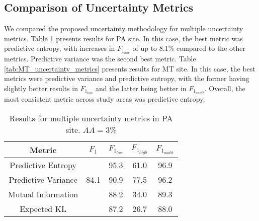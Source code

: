 \subsection{Comparison of Uncertainty Metrics}\label{sec:results_metrics}

We compared the proposed uncertainty methodology for multiple uncertainty metrics. Table \ref{tab:PA_uncertainty_metrics} presents results for PA site. In this case, the best metric was predictive entropy, with increases in $F_{1_{low}}$ of up to 8.1\% compared to the other metrics. Predictive variance was the second best metric. Table \ref{tab:MT_uncertainty_metrics} presents results for MT site. In this case, the best metrics were predictive variance and predictive entropy, with the former having slightly better results in $F_{1_{low}}$ and the latter being better in $F_{1_{audit}}$. Overall, the most consistent metric across study areas was predictive entropy.



\begin{table}[ht!]
\caption{Results for multiple uncertainty metrics in PA site. $AA=3\%$} 
\centering
\begin{tabular}{c|c|ccc}
\hline
\textbf{Metric}     & \textbf{$F_1$} & \textbf{$F_{1_{low}}$} & \textbf{$F_{1_{high}}$} & \textbf{$F_{1_{audit}}$} \\ \hline
Predictive Entropy  & \multirow{3}{*}{84.1} & 95.3                 & 61.0                  & 96.9                     \\
Predictive Variance &                       & 90.9                 & 77.5                  & 96.2                   \\
Mutual Information  &                       & 88.2                 & 34.0                  & 89.3                   \\
Expected KL  &                       & 87.2                 & 26.7                  & 88.0                   \\ \hline
\end{tabular}
\label{tab:PA_uncertainty_metrics}
\end{table}


